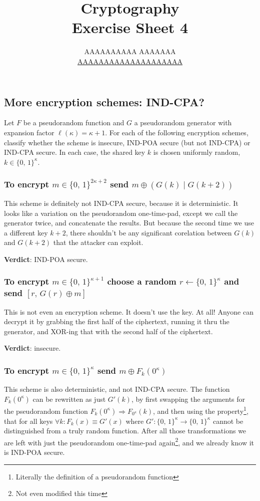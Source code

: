 \documentclass{article}
\title{Cryptography \\ Exercise Sheet 4}
\author{
  AAAAAAAAAA AAAAAAA \\
  \href{mailto:AAAAAAAAAAAAAAAAAAAA}{AAAAAAAAAAAAAAAAAAAA}
}
\begin{document}
  \maketitle

  \setcounter{section}{4}
  \subsection{More encryption schemes: IND-CPA?}
  \begin{centerframebox}
    Let $F$ be a pseudorandom function and $G$ a pseudorandom generator with expansion factor $\ell(\kappa) = \kappa + 1$.
    For each of the following encryption schemes, classify whether the scheme is insecure, IND-POA secure (but not IND-CPA) or IND-CPA secure.
    In each case, the shared key $k$ is chosen uniformly random, $k \in \{0,\, 1\}^\kappa$.

  \end{centerframebox}
  \subsubsection{To encrypt $m \in \{0,\, 1\}^{2\kappa+2}$ send $m \oplus (G(k) \mid G(k + 2))$}
  This scheme is definitely not IND-CPA secure, because it is deterministic.
  It looks like a variation on the pseudorandom one-time-pad, except we call the generator twice,
  and concatenate the results.
  But because the second time we use a different key $k + 2$,
  there shouldn't be any significant corelation between $G(k)$ and $G(k + 2)$ that the attacker can exploit.

  \textbf{Verdict}: IND-POA secure.

  \subsubsection{To encrypt $m \in \{0,\, 1\}^{\kappa+1}$ choose a random $r \leftarrow \{0,\, 1\}^\kappa$ and send $[r,\, G(r) \oplus m]$}
  This is not even an encryption scheme. It doesn't use the key. At all!
  Anyone can decrypt it by grabbing the first half of the ciphertext, running it thru the generator, and XOR-ing that with the second half of the ciphertext.

  \textbf{Verdict}: insecure.

  \subsubsection{To encrypt $m \in \{0,\, 1\}^{\kappa}$ send $m \oplus F_k(0^\kappa)$}
  This scheme is also deterministic, and not IND-CPA secure.
  The function $F_k(0^\kappa)$ can be rewritten as just $G'(k)$,
  by first swapping the arguments for the pseudorandom function $F_k(0^\kappa) \Rightarrow F_{0^\kappa}(k)$,
  and then using the property\footnote{Literally the definition of a pseudorandom function},
  that for all keys $\forall k : F_k(x) \equiv G'(x)$ where $G': \{0,\, 1\}^{\kappa} \to \{0,\, 1\}^{\kappa}$ cannot be distinguished from a truly random function.
  After all those transformations we are left with just the pseudorandom one-time-pad again\footnote{Not even modified this time},
  and we already know it is IND-POA secure.
\end{document}
